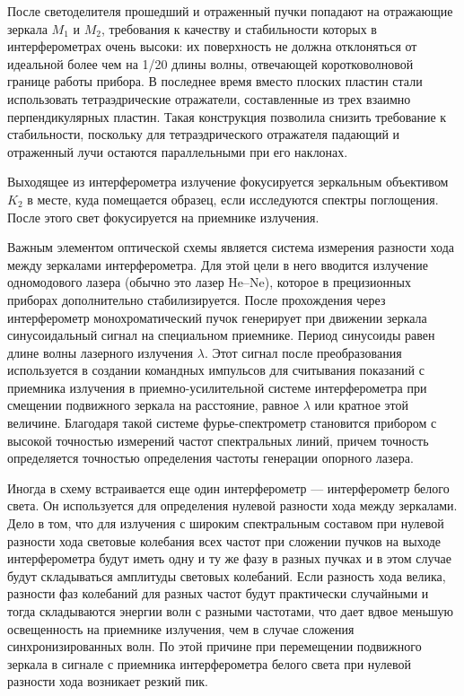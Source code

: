 После светоделителя прошедший и отраженный пучки попадают на
отражающие зеркала $M_1$ и $M_2$, требования к качеству и стабильности
которых в интерферометрах очень высоки: их поверхность не должна
отклоняться от идеальной более чем на 1/20 длины волны, отвечающей коротковолновой границе работы прибора. В последнее время
вместо плоских пластин стали использовать тетраэдрические отражатели, составленные из трех взаимно перпендикулярных пластин. Такая
конструкция позволила снизить требование к стабильности, поскольку для тетраэдрического отражателя падающий и отраженный лучи
остаются параллельными при его наклонах.

Выходящее из интерферометра излучение фокусируется зеркальным объективом $K_2$ в месте, куда помещается образец, если исследуются спектры поглощения. После этого свет фокусируется на приемнике излучения.

Важным элементом оптической схемы является система измерения
разности хода между зеркалами интерферометра. Для этой цели в него вводится излучение одномодового
лазера (обычно это лазер He–Ne), которое в прецизионных приборах
дополнительно стабилизируется. После прохождения через интерферометр монохроматический пучок генерирует при движении зеркала синусоидальный сигнал на специальном приемнике. Период синусоиды
равен длине волны лазерного излучения $\lambda$. Этот сигнал после преобразования используется в создании командных импульсов для считывания показаний с приемника излучения в приемно-усилительной
системе интерферометра при смещении подвижного зеркала на расстояние, равное $\lambda$ или кратное этой величине. Благодаря такой системе фурье-спектрометр становится прибором с высокой точностью
измерений частот спектральных линий, причем точность определяется
точностью определения частоты генерации опорного лазера.

Иногда в схему встраивается еще один интерферометр — интерферометр белого света. Он используется
для определения нулевой разности хода между зеркалами. Дело в том,
что для излучения с широким спектральным составом при нулевой разности хода световые колебания всех частот при сложении пучков на
выходе интерферометра будут иметь одну и ту же фазу в разных пучках
и в этом случае будут складываться амплитуды световых колебаний.
Если разность хода велика, разности фаз колебаний для разных частот
будут практически случайными и тогда складываются энергии волн с
разными частотами, что дает вдвое меньшую освещенность на приемнике излучения, чем в случае сложения синхронизированных волн.
По этой причине при перемещении подвижного зеркала в сигнале с
приемника интерферометра белого света при нулевой разности хода
возникает резкий пик.

